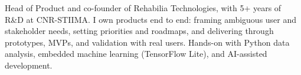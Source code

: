 {Head of Product and co-founder of Rehabilia Technologies, with 5+ years of R\&D at CNR-STIIMA. I own products end to end: framing ambiguous user and stakeholder needs, setting priorities and roadmaps, and delivering through prototypes, MVPs, and validation with real users. Hands-on with Python data analysis, embedded machine learning (TensorFlow Lite), and AI-assisted development.}

